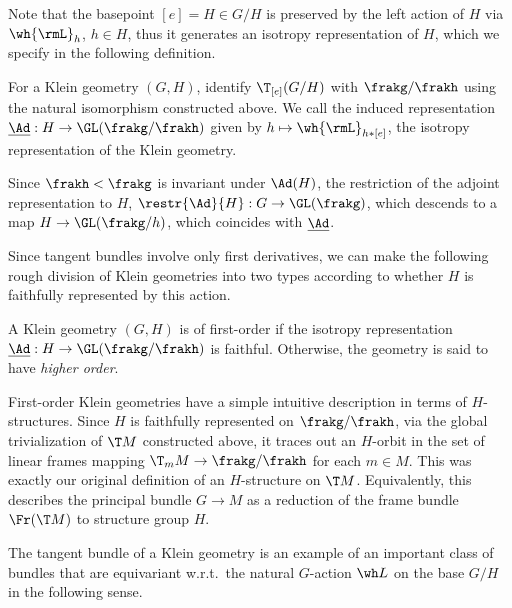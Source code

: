 Note that the basepoint $[e]=H\in G\slash H$ is preserved by the left action of $H$ via $\wh{\rmL}_h$, $h\in H$, thus it generates an isotropy representation of $H$, which we specify in the following definition.

\begin{defn}\label{def isotropy rep}
    For a Klein geometry $(G,H)$, identify $\T_{[e]}(G\slash H)$ with $\frakg\slash\frakh$ using the natural isomorphism constructed above. We call the induced representation $\underline{\Ad}:H\to \GL(\frakg\slash\frakh)$ given by $h\mapsto \wh{\rmL}_{h\ast [e]}$, the isotropy representation of the Klein geometry.

    Since $\frakh<\frakg$ is invariant under $\Ad(H)$, the restriction of the adjoint representation to $H$, $\restr{\Ad}{H}:G\to \GL(\frakg)$, which descends to a map $H\to \GL(\frakg\slash h)$, which coincides with $\underline{\Ad}$.
\end{defn}

Since tangent bundles involve only first derivatives, we can make the following rough division of Klein geometries into two types according to whether $H$ is faithfully represented by this action.

\begin{defn}
    A Klein geometry $(G,H)$ is of first-order if the isotropy representation $\underline{\Ad}:H\to \GL(\frakg\slash\frakh)$ is faithful. Otherwise, the geometry is said to have \emph{higher order}.
\end{defn}

\begin{rem}
    First-order Klein geometries have a simple intuitive description in terms of $H$-structures. Since $H$ is faithfully represented on $\frakg\slash\frakh$, via the global trivialization of $\T M$ constructed above, it traces out an $H$-orbit in the set of linear frames mapping $\T_mM\to \frakg\slash\frakh$ for each $m\in M$. This was exactly our original definition of an $H$-structure on $\T M$. Equivalently, this describes the principal bundle $G\to M$ as a reduction of the frame bundle $\Fr(\T M)$ to structure group $H$.
\end{rem}

The tangent bundle of a Klein geometry is an example of an important class of bundles that are equivariant w.r.t.\ the natural $G$-action $\wh L$ on the base $G\slash H$ in the following sense.


